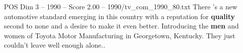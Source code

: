 \begin{textsample}{POS Dim 3 – 1990 – Score 2.00 – 1990/tv\_com\_1990\_80.txt}  \label{ex:f3_pos_073}
There 's a new automotive standard emerging in this country with a reputation for \textbf{quality} second to none and a desire to make it even better.
Introducing the \textbf{men} and women of Toyota Motor Manufacturing in Georgetown, Kentucky.
They just couldn't leave well enough alone..

\end{textsample}
